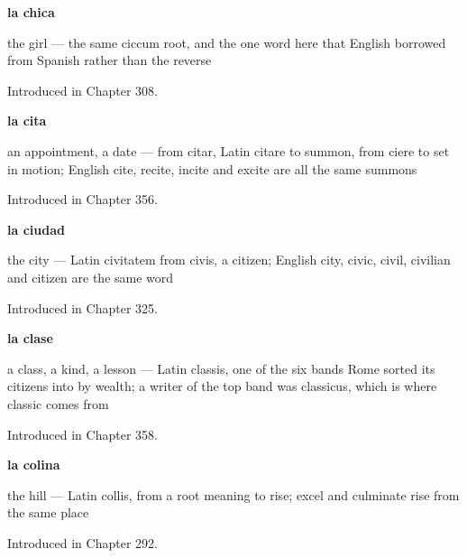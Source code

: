 \noindent\begin{minipage}[t]{\linewidth}
\raggedright
\textbf{la chica}\par
\small the girl --- the same ciccum root, and the one word here that English borrowed from Spanish rather than the reverse\par
\footnotesize Introduced in Chapter 308.
\end{minipage}\par\medskip

\noindent\begin{minipage}[t]{\linewidth}
\raggedright
\textbf{la cita}\par
\small an appointment, a date — from citar, Latin citare to summon, from ciere to set in motion; English cite, recite, incite and excite are all the same summons\par
\footnotesize Introduced in Chapter 356.
\end{minipage}\par\medskip

\noindent\begin{minipage}[t]{\linewidth}
\raggedright
\textbf{la ciudad}\par
\small the city — Latin civitatem from civis, a citizen; English city, civic, civil, civilian and citizen are the same word\par
\footnotesize Introduced in Chapter 325.
\end{minipage}\par\medskip

\noindent\begin{minipage}[t]{\linewidth}
\raggedright
\textbf{la clase}\par
\small a class, a kind, a lesson — Latin classis, one of the six bands Rome sorted its citizens into by wealth; a writer of the top band was classicus, which is where classic comes from\par
\footnotesize Introduced in Chapter 358.
\end{minipage}\par\medskip

\noindent\begin{minipage}[t]{\linewidth}
\raggedright
\textbf{la colina}\par
\small the hill — Latin collis, from a root meaning to rise; excel and culminate rise from the same place\par
\footnotesize Introduced in Chapter 292.
\end{minipage}\par\medskip

